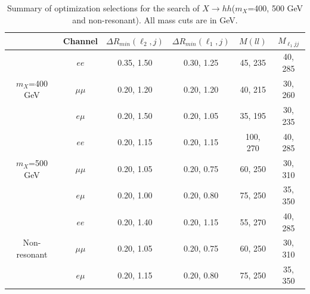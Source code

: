 \begin{table}[h]
\begin{center}
\begin{tabular}{c|c|c|c|c|c}
\hline
\hline
  &Channel &$\Delta R_{min}(\ell_{2}, j)$ &$\Delta R_{min}(\ell_{1}, j)$ &$M(ll)$  &$M_{\ell_{1}jj}$ \\
\hline
\multirow{3}{2.0cm}{$m_X$=400 GeV} &$ee$
&0.35, 1.50
&0.30, 1.25
&45, 235
&40, 285 \\
&$\mu\mu$
&0.20, 1.20
&0.20, 1.20
&40, 215
&30, 260 \\
&$e\mu$
&0.20, 1.50
&0.20, 1.05
&35, 195
&30, 235 \\
\hline
\multirow{3}{2.0cm}{$m_X$=500 GeV} &$ee$
&0.20, 1.15
&0.20, 1.15
&100, 270
&40, 285 \\
&$\mu\mu$
&0.20, 1.05
&0.20, 0.75
&60, 250
&30, 310 \\
&$e\mu$
&0.20, 1.00
&0.20, 0.80
&75, 250
&35, 350 \\
\hline
\multirow{3}{2.0cm}{Non-resonant} & $ee$
&0.20, 1.40
&0.20, 1.15
&55, 270
&40, 285 \\
&$\mu\mu$
&0.20, 1.05
&0.20, 0.75
&60, 250
&30, 310 \\
&$e\mu$
&0.20, 1.15
&0.20, 0.80
&75, 250
&35, 350 \\
\hline
\hline
\end{tabular}
\end{center}
\caption{Summary of optimization selections for the search of $X \rightarrow hh$($m_{X}$=400, 500 GeV and non-resonant). All mass cuts are in GeV.}
\label{optimization_cuts_highmass}
\end{table}
 
 
 
